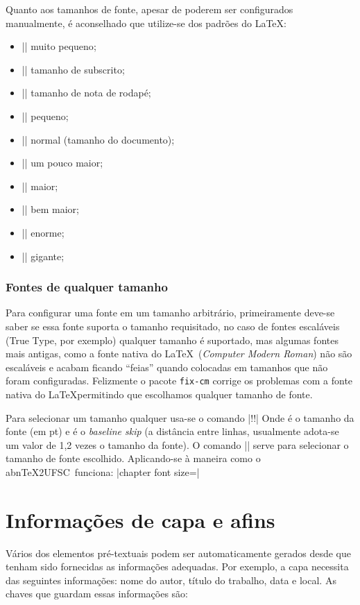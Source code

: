 \documentclass[openright]{memoir}
\newcommand*{\abntexUFSC}{abn\TeX2UFSC}
\newcommand{\emingles}[1]{\foreignlanguage{english}{\textit{#1}}}
\begin{document}
Quanto aos tamanhos de fonte, apesar de poderem ser configurados manualmente, é aconselhado que utilize-se dos padrões do \LaTeX:

\begin{itemize}
\item \code|\tiny| {\tiny muito pequeno};
\item \code|\scriptsize| {\scriptsize tamanho de subscrito};
\item \code|\footnotesize| {\footnotesize tamanho de nota de rodapé};
\item \code|\small| {\small pequeno};
\item \code|\normalsize| {\normalsize normal} (tamanho do documento);
\item \code|\large| {\large um pouco maior};
\item \code|\Large| {\Large maior};
\item \code|\LARGE| {\LARGE bem maior};
\item \code|\huge| {\huge enorme};
\item \code|\Huge| {\Huge gigante};
\end{itemize}

\subsubsection{Fontes de qualquer tamanho}
\label{fonte-qualquer}

Para configurar uma fonte em um tamanho arbitrário, primeiramente deve-se saber se essa fonte suporta o tamanho requisitado, no caso de fontes escaláveis (True Type, por exemplo) qualquer tamanho é suportado, mas algumas fontes mais antigas, como a fonte nativa do \LaTeX\ (\emph{Computer Modern Roman}) não são escaláveis e acabam ficando ``feias'' quando colocadas em tamanhos que não foram configuradas. Felizmente o pacote \texttt{fix-cm} corrige os problemas com a fonte nativa do \LaTeX permitindo que escolhamos qualquer tamanho de fonte.

Para selecionar um tamanho qualquer usa-se o comando \displaycode|\fontesize!!\selectfont| Onde  é o tamanho da fonte (em pt) e  é o \emingles{baseline skip} (a distância entre linhas, usualmente adota-se um valor de 1,2 vezes o tamanho da fonte). O comando \code|\selectfont| serve para selecionar o tamanho de fonte escolhido. Aplicando-se à maneira como o \abntexUFSC\ funciona: \displaycode|chapter font size={\fontsize{16pt}{19.2pt}\selectfont}|
\section{Informações de capa e afins}
Vários dos elementos pré-textuais podem ser automaticamente gerados desde que tenham sido fornecidas as informações adequadas. Por exemplo, a capa necessita das seguintes informações: nome do autor, título do trabalho, data e local. As chaves que guardam essas informações são:
\end{document}
